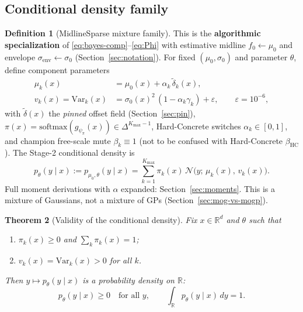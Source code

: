 \documentclass[11pt,a4paper]{article}
\theoremstyle{plain}
\newtheorem{theorem}{Theorem}[section]
\theoremstyle{definition}
\newtheorem{definition}[theorem]{Definition}
\theoremstyle{remark}
\newcommand{\R}{\mathbb{R}}
\newcommand{\Ncal}{\mathcal{N}}
\newcommand{\tht}{\theta}
\newcommand{\Kmax}{K_{\max}}
\newcommand{\simplex}{\Delta}
\begin{document}
\subsection{Conditional density family}
\begin{definition}[MidlineSparse mixture family]
\label{def:stage2-mix}
This is the \textbf{algorithmic specialization} of \eqref{eq:bayes-comp}--\eqref{eq:Phi}
with estimative midline \(f_0\leftarrow\mu_0\) and envelope
\(\sigma_{\mathrm{env}}\leftarrow\sigma_0\) (Section~\ref{sec:notation}).
For fixed \((\mu_0,\sigma_0)\) and parameter \(\tht\), define component parameters
\begin{align}
  \mu_k(x)
  &=
  \mu_0(x)+\alpha_k\,\tilde\delta_k(x),
  \label{eq:muk}
  \\
  v_k(x)
  =
  \mathrm{Var}_k(x)
  &=
  \sigma_0(x)^2\,(1-\alpha_k\gamma_k)+\varepsilon,
  \qquad
  \varepsilon=10^{-6},
  \label{eq:vark}
\end{align}
with \(\tilde\delta(x)\) the \emph{pinned} offset field (Section~\ref{sec:pin}),
\(\pi(x)=\mathrm{softmax}(g_{\psi_\pi}(x))\in\simplex^{\Kmax-1}\),
Hard-Concrete switches \(\alpha_k\in[0,1]\), and champion free-scale mute
\(\beta_k\equiv 1\) (not to be confused with Hard-Concrete \(\beta_{\mathrm{HC}}\)).
The Stage-2 conditional density is
\begin{equation}
  p_\tht(y\mid x)
  :=
  p_{\mu_0,\tht}(y\mid x)
  =
  \sum_{k=1}^{\Kmax}
  \pi_k(x)\,
  \Ncal\!\bigl(y;\,\mu_k(x),\,v_k(x)\bigr).
  \label{eq:mix}
\end{equation}
Full moment derivations with \(\alpha\) expanded: Section~\ref{sec:moments}.
This is a mixture of Gaussians, not a mixture of GPs
(Section~\ref{sec:mog-vs-mogp}).
\end{definition}

\begin{theorem}[Validity of the conditional density]
\label{thm:valid-density}
Fix \(x\in\R^d\) and \(\tht\) such that
\begin{enumerate}[label=(\roman*)]
  \item \(\pi_k(x)\ge 0\) and \(\sum_k\pi_k(x)=1\);
  \item \(v_k(x)=\mathrm{Var}_k(x)>0\) for all \(k\).
\end{enumerate}
Then \(y\mapsto p_\tht(y\mid x)\) is a probability density on \(\R\):
\[
  p_\tht(y\mid x)\ge 0
  \quad\text{for all }y,
  \qquad
  \int_{\R} p_\tht(y\mid x)\,dy = 1.
\]
\end{theorem}
\end{document}
